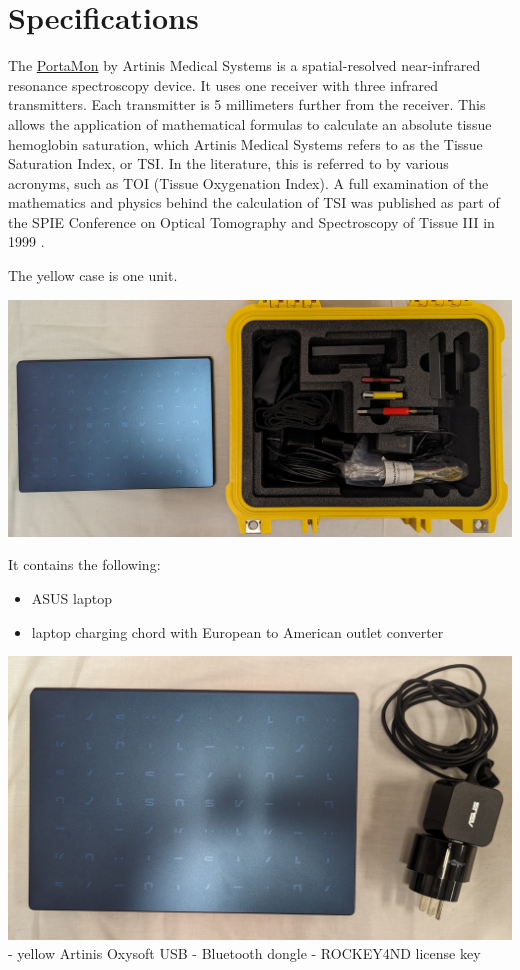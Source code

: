 \documentclass[
]{book}
\providecommand{\tightlist}{%
  \setlength{\itemsep}{0pt}\setlength{\parskip}{0pt}}
\begin{document}
\hypertarget{PortaMon-Specs}{%
\section{Specifications}\label{PortaMon-Specs}}

The \href{https://www.artinis.com/portamon}{PortaMon} by Artinis Medical Systems is a spatial-resolved near-infrared resonance spectroscopy device. It uses one receiver with three infrared transmitters. Each transmitter is 5 millimeters further from the receiver. This allows the application of mathematical formulas to calculate an absolute tissue hemoglobin saturation, which Artinis Medical Systems refers to as the Tissue Saturation Index, or TSI. In the literature, this is referred to by various acronyms, such as TOI (Tissue Oxygenation Index). A full examination of the mathematics and physics behind the calculation of TSI was published as part of the SPIE Conference on Optical Tomography and Spectroscopy of Tissue III in 1999 \citep{Suzuki1999TissueOM}.

The yellow case is one unit.

\includegraphics[width=1\linewidth]{images/portamon/portamoncase}

It contains the following:

\begin{itemize}
\tightlist
\item
  ASUS laptop
\item
  laptop charging chord with European to American outlet converter
\end{itemize}

\includegraphics[width=1\linewidth]{images/portamon/asuslaptopandcharger}
- yellow Artinis Oxysoft USB
- Bluetooth dongle
- ROCKEY4ND license key
\end{document}
